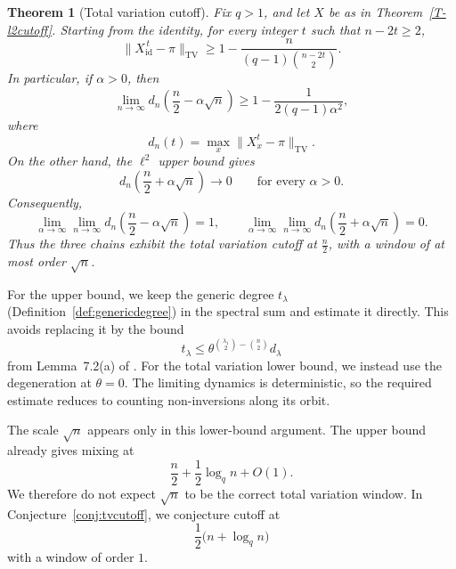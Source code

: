 \documentclass[11pt]{article}
\theoremstyle{plain}  %
\newtheorem{theorem}{Theorem}[section]
\begin{document}
\begin{theorem}[Total variation cutoff]\label{T-tv}
Fix $q>1$, and let $X$ be as in Theorem~\ref{T-l2cutoff}. Starting from the
identity, for every integer $t$ such that $n-2t\geq2$,
\[
    \bigl\|X_{\mathrm{id}}^{\,t}-\pi\bigr\|_{\mathrm{TV}}
    \geq
    1-
    \frac{n}
    {(q-1)\binom{n-2t}{2}}.
\]
In particular, if $\alpha>0$, then
\[
    \lim_{n\to\infty}
    d_n\left(\frac n2-\alpha\sqrt n\right)
    \geq
    1-\frac{1}{2(q-1)\alpha^2},
\]
where
\[
    d_n(t)=\max_x\|X_x^t-\pi\|_{\mathrm{TV}}.
\]
On the other hand, the $\ell^2$ upper bound gives
\[
    d_n\left(\frac n2+\alpha\sqrt n\right)\longrightarrow0
    \qquad\text{for every }\alpha>0.
\]
Consequently,
\[
\lim_{\alpha\to\infty}
\lim_{n\to\infty}
d_n\left(\frac n2-\alpha\sqrt n\right)=1,
\qquad
\lim_{\alpha\to\infty}
\lim_{n\to\infty}
d_n\left(\frac n2+\alpha\sqrt n\right)=0.
\]
Thus the three chains exhibit the total variation cutoff at $\frac{n}{2}$, with a window
of at most order $\sqrt n$.
\end{theorem}

For the upper bound, we keep the generic degree $t_\lambda$
(Definition~\ref{def:genericdegree}) in the spectral sum and estimate it
directly. This avoids replacing it by the bound
\[
    t_\lambda
    \leq
    \theta^{\binom{\lambda_1}{2}-\binom n2}d_\lambda
\]
from Lemma~7.2(a) of \cite{DiaconisRam2000}. For the total variation lower
bound, we instead use the degeneration at $\theta=0$. The limiting dynamics
is deterministic, so the required estimate reduces to counting
non-inversions along its orbit.


The scale $\sqrt n$ appears only in this lower-bound argument. The upper bound
already gives mixing at
\[
    \frac n2+\frac12\log_q n+O(1).
\]
We therefore do not expect $\sqrt n$ to be the correct total variation
window. In Conjecture~\ref{conj:tvcutoff}, we conjecture cutoff at
\[
    \frac12\bigl(n+\log_q n\bigr)
\]
with a window of order $1$.
\end{document}
